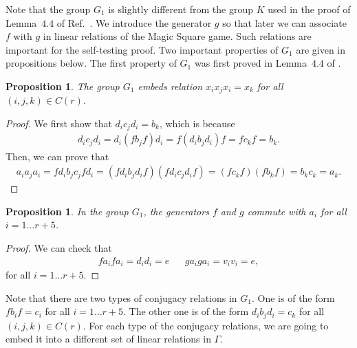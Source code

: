 \documentclass[11pt,letterpaper]{article}
\newcommand{\1}{\mathbb{1}}
\newtheorem{proposition}[theorem]{Proposition}
\theoremstyle{definition}
\begin{document}
Note that the group $G_1$ is slightly different from the group $K$ used in the proof of Lemma~$4.4$ of Ref.~\cite{slofstra2017}.
We introduce the generator $g$ so that later we can associate $f$ with $g$ in linear relations of the Magic Square game.
Such relations are important for the self-testing proof.
Two important properties of $G_1$ are given in propositions below.
The first property of $G_1$ was first proved in Lemma~$4.4$ of \cite{slofstra2017}.
\begin{proposition}
	The group $G_1$ embeds relation $x_ix_jx_i = x_k$ for all $(i,j,k) \in C(r)$.
\end{proposition}
\begin{proof}
	We first show that $d_i c_j d_i = b_k$, which is because
	\begin{align*}
		d_i c_j d_i = d_i (f b_j f) d_i = f (d_i b_j d_i) f = f c_k f = b_k.
	\end{align*}
	Then, we can prove that 
	\begin{align*}
		a_i a_j a_i = f d_i b_j c_j f d_i = (f d_i b_j d_i f)(f d_i c_j d_i f) = (f c_k f)(f b_k f) = b_k c_k = a_k. 
	\end{align*}
\end{proof}
\begin{proposition}
	In the group $G_1$, the generators $f$ and $g$ commute with $a_i$ for all $i = 1 \dots r+5$.
\end{proposition}
\begin{proof}
	We can check that
	\begin{align*}
		fa_i f a_i = d_i d_i = e && g a_i g a_i = v_i v_i  = e,
	\end{align*}
	for all $i = 1 \dots r+5$.
\end{proof}
Note that there are two types of conjugacy relations in $G_1$. One is of the form
$f b_i f = c_i$ for all $i = 1 \dots r+5$. The other one is of the form 
$d_ib_jd_i = c_k$ for all $(i,j,k) \in C(r)$. For each type of the conjugacy relations, 
we are going to embed it into a different set of linear relations in $\Gamma$.
\end{document}
